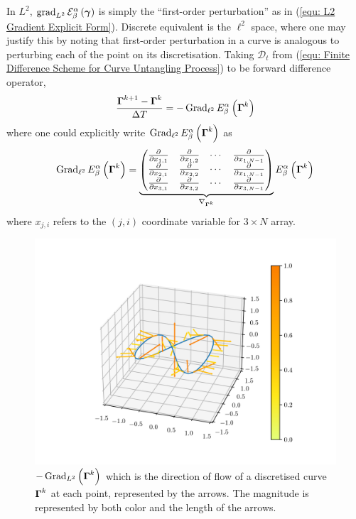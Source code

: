 \documentclass[../dissertation.tex]{subfiles}
\begin{document}
In $L^2$, $\operatorname{grad}_{L^2} \mathcal{E}_{\beta}^{\alpha} \left( \boldsymbol{\gamma} \right)$ is simply the ``first-order perturbation'' as in (\ref{equ: L2 Gradient Explicit Form}).
Discrete equivalent is the $\ell^2$ space,
where one may justify this by noting that first-order perturbation in a curve is analogous to perturbing each of the point on its discretisation.
Taking $\mathcal{D}_t$ from (\ref{equ: Finite Difference Scheme for Curve Untangling Process}) to be forward difference operator,
\begin{equation}
    \frac{\boldsymbol{\Gamma}^{k+1} - \boldsymbol{\Gamma}^k}{\Delta T} = - \operatorname{Grad}_{\ell^2} E_{\beta}^{\alpha} \left( \boldsymbol{\Gamma}^k \right)
    \label{equ: L2 Explicit Euler}
\end{equation}
where one could explicitly write $\operatorname{Grad}_{\ell^2} E_{\beta}^\alpha \left( \boldsymbol{\Gamma}^k \right)$ as
\begin{equation}
    \operatorname{Grad}_{\ell^2} E_{\beta}^\alpha \left( \boldsymbol{\Gamma}^k \right)
    =
    \underbrace{
        \begin{pmatrix}
            \frac{\partial}{\partial x_{1,1}} & \frac{\partial}{\partial x_{1,2}} & \cdots & \frac{\partial}{\partial x_{1,N-1}} \\
            \frac{\partial}{\partial x_{2,1}} & \frac{\partial}{\partial x_{2,2}} & \cdots & \frac{\partial}{\partial x_{1,N-1}} \\
            \frac{\partial}{\partial x_{3,1}} & \frac{\partial}{\partial x_{3,2}} & \cdots & \frac{\partial}{\partial x_{3,N-1}}
        \end{pmatrix}
    }_{\nabla_{\boldsymbol{\Gamma}^k}}
    E_{\beta}^{\alpha} \left( \boldsymbol{\Gamma}^k \right)
    \label{equ: Gradient in l2}
\end{equation}
where $x_{j,i}$ refers to the $\left( j,i \right)$ coordinate variable for $3 \times N$ array.
\begin{figure}[tbp]
    \centering
    \includegraphics[width=\textwidth]{sections/unknottingCurveImgs/L2Derivative}
    \caption{$-\operatorname{Grad}_{L^2} \left( \boldsymbol{\Gamma}^k \right)$ which is the direction of flow of a discretised curve $\boldsymbol{\Gamma}^k$ at each point, represented by the arrows. The magnitude is represented by both color and the length of the arrows.}
\end{figure}
\end{document}

